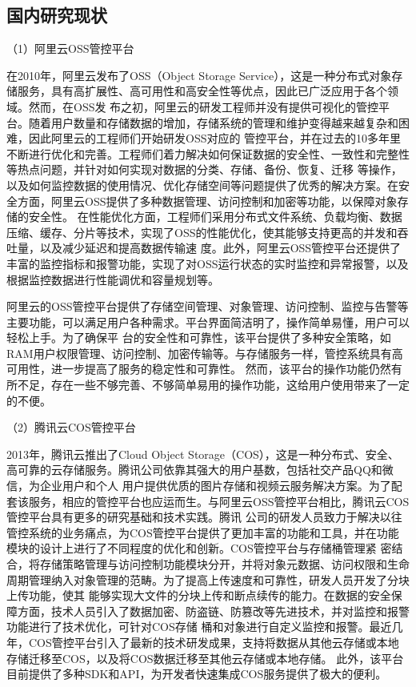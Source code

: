 \subsection{国内研究现状}

（1）阿里云OSS管控平台

在2010年，阿里云发布了OSS（Object Storage Service），这是一种分布式对象存储服务，具有高扩展性、高可用性和高安全性等优点，因此已广泛应用于各个领域\cite{knuth84}。然而，在OSS发
布之初，阿里云的研发工程师并没有提供可视化的管控平台。随着用户数量和存储数据的增加，存储系统的管理和维护变得越来越复杂和困难，因此阿里云的工程师们开始研发OSS对应的
管控平台，并在过去的10多年里不断进行优化和完善。工程师们着力解决如何保证数据的安全性、一致性和完整性等热点问题，并针对如何实现对数据的分类、存储、备份、恢复、迁移
等操作，以及如何监控数据的使用情况、优化存储空间等问题提供了优秀的解决方案。在安全方面，阿里云OSS提供了多种数据管理、访问控制和加密等功能，以保障对象存储的安全性\cite{kongqingyong2015keji}。
在性能优化方面，工程师们采用分布式文件系统、负载均衡、数据压缩、缓存、分片等技术，实现了OSS的性能优化，使其能够支持更高的并发和吞吐量，以及减少延迟和提高数据传输速
度。此外，阿里云OSS管控平台还提供了丰富的监控指标和报警功能，实现了对OSS运行状态的实时监控和异常报警，以及根据监控数据进行性能调优和容量规划等。

阿里云的OSS管控平台提供了存储空间管理、对象管理、访问控制、监控与告警等主要功能，可以满足用户各种需求。平台界面简洁明了，操作简单易懂，用户可以轻松上手。为了确保平
台的安全性和可靠性，该平台提供了多种安全策略，如RAM用户权限管理、访问控制、加密传输等。与存储服务一样，管控系统具有高可用性，进一步提高了服务的稳定性和可靠性。
然而，该平台的操作功能仍然有所不足，存在一些不够完善、不够简单易用的操作功能，这给用户使用带来了一定的不便。

（2）腾讯云COS管控平台


2013年，腾讯云推出了Cloud Object Storage（COS），这是一种分布式、安全、高可靠的云存储服务。腾讯公司依靠其强大的用户基数，包括社交产品QQ和微信，为企业用户和个人
用户提供优质的图片存储和视频云服务解决方案\cite{kongq2015keji}。为了配套该服务，相应的管控平台也应运而生。与阿里云OSS管控平台相比，腾讯云COS管控平台具有更多的研究基础和技术实践。腾讯
公司的研发人员致力于解决以往管控系统的业务痛点，为COS管控平台提供了更加丰富的功能和工具，并在功能模块的设计上进行了不同程度的优化和创新。COS管控平台与存储桶管理紧
密结合，将存储策略管理与访问控制功能模块分开，并将对象元数据、访问权限和生命周期管理纳入对象管理的范畴。为了提高上传速度和可靠性，研发人员开发了分块上传功能，使其
能够实现大文件的分块上传和断点续传的能力。在数据的安全保障方面，技术人员引入了数据加密、防盗链、防篡改等先进技术，并对监控和报警功能进行了技术优化，可针对COS存储
桶和对象进行自定义监控和报警。最近几年，COS管控平台引入了最新的技术研发成果，支持将数据从其他云存储或本地存储迁移至COS，以及将COS数据迁移至其他云存储或本地存储。
此外，该平台目前提供了多种SDK和API，为开发者快速集成COS服务提供了极大的便利。


